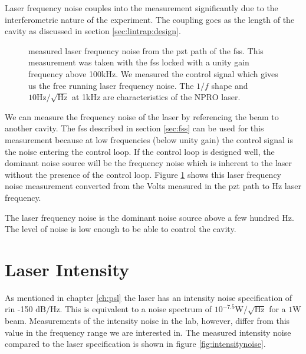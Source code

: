Laser frequency noise couples into the measurement significantly due to the
interferometric nature of the experiment.
The coupling goes as the length of the cavity as discussed in section
\ref{sec:lintrap:design}.

\begin{figure}
  \caption[Frequency Noise]{measured laser frequency noise
    from the \ac{pzt} path of the \ac{fss}.
    This measurement was taken with the \ac{fss} locked with a unity gain
    frequency above 100kHz.
    We measured the control signal which gives us the free running laser
    frequency noise.
    The $1/f$ shape and $\mathrm{10Hz/\sqrt{Hz}}$ at 1kHz are characteristics
    of the NPRO laser.
    }
  \label{fig:frequencynoise}
\end{figure}

We can measure the frequency noise of the laser by referencing the beam to
another cavity. The \ac{fss} described in section \ref{sec:fss} can be used
for this measurement because at low frequencies (below unity gain) the control
signal is the noise entering the control loop.
If the control loop is designed well, the dominant noise source will be the
frequency noise which is inherent to the laser without the presence of the
control loop.
Figure \ref{fig:frequencynoise} shows this laser frequency noise measurement
converted from the Volts measured in the \ac{pzt} path to Hz laser frequency.

The laser frequency noise is the dominant noise source above a few hundred Hz.
The level of noise is low enough to be able to control the cavity.


\section{Laser Intensity}

As mentioned in chapter \ref{ch:psl} the laser has an intensity noise
specification of \ac{rin} -150 $\mathrm{dB}/\mathrm{Hz}$. This is equivalent to a noise
spectrum of $10^{-7.5} \mathrm{W}/\sqrt{\mathrm{Hz}}$ for a $1 \mathrm{W}$ beam.
Measurements of the intensity noise in the lab, however, differ from this
value in the frequency range we are interested in.
The measured intensity noise compared to the laser specification is shown
in figure \ref{fig:intensitynoise}.

